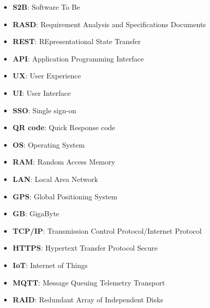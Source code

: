 \begin{itemize}
      \item \textbf{S2B}: Software To Be
      \item \textbf{RASD}: Requirement Analysis and Specifications Documents
      \item \textbf{REST}: REpresentational State Transfer
      \item \textbf{API}: Application Programming Interface
      \item \textbf{UX}: User Experience
      \item \textbf{UI}: User Interface
      \item \textbf{SSO}: Single sign-on
      \item \textbf{QR code}: Quick Response code
      \item \textbf{OS}: Operating System
      \item \textbf{RAM}: Random Access Memory
      \item \textbf{LAN}: Local Area Network
      \item \textbf{GPS}: Global Positioning System
      \item \textbf{GB}: GigaByte
      \item \textbf{TCP/IP}: Transmission Control Protocol/Internet Protocol
      \item \textbf{HTTPS}: Hypertext Transfer Protocol Secure
      \item \textbf{IoT}: Internet of Things
      \item \textbf{MQTT}: Message Queuing Telemetry Transport
      \item \textbf{RAID}: Redundant Array of Independent Disks


\end{itemize}

